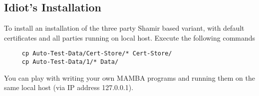 \subsection{Idiot's Installation}
\label{sec:idiot}
To install an installation of the three party Shamir based
variant, with default certificates and all parties running
on local host. 
Execute the following commands
\begin{verbatim}
     cp Auto-Test-Data/Cert-Store/* Cert-Store/
     cp Auto-Test-Data/1/* Data/
\end{verbatim}
You can play with writing your own MAMBA programs and 
running them on the same local host (via IP address
127.0.0.1).


